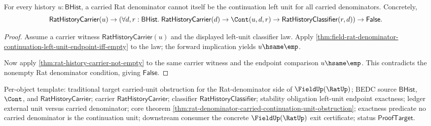 \begin{theorem}
\label{thm:rat-denominator-carried-continuation-unit-obstruction}
For every history $u:\mathsf{BHist}$, a carried Rat denominator cannot itself be
the continuation left unit for all carried denominators. Concretely,
$$
\mathsf{RatHistoryCarrier}(u)
\to
\left(
\forall d,r:\mathsf{BHist}.\;
\mathsf{RatHistoryCarrier}(d)\to
\Cont(u,d,r)\to
\mathsf{RatHistoryClassifier}(r,d)
\right)
\to
\mathsf{False}.
$$
\end{theorem}
\begin{proof}
Assume a carrier witness $\mathsf{RatHistoryCarrier}(u)$ and the displayed
left-unit classifier law. Apply
\autoref{thm:field-rat-denominator-continuation-left-unit-endpoint-iff-empty}
to the law; the forward implication yields $u\hsame\emp$.

Now apply \autoref{thm:rat-history-carrier-not-empty} to the same carrier
witness and the endpoint comparison $u\hsame\emp$. This contradicts the
nonempty Rat denominator condition, giving $\mathsf{False}$.
\end{proof}

Per-object template: traditional target carried-unit obstruction for the
Rat-denominator side of $\FieldUp(\RatUp)$; BEDC source $\mathsf{BHist}$,
$\Cont$, and $\mathsf{RatHistoryCarrier}$; carrier
$\mathsf{RatHistoryCarrier}$; classifier $\mathsf{RatHistoryClassifier}$;
stability obligation left-unit endpoint exactness; ledger external unit versus
carried denominator; core theorem
\autoref{thm:rat-denominator-carried-continuation-unit-obstruction}; exactness
predicate no carried denominator is the continuation unit; downstream consumer
the concrete $\FieldUp(\RatUp)$ exit certificate; status $\mathsf{ProofTarget}$.
